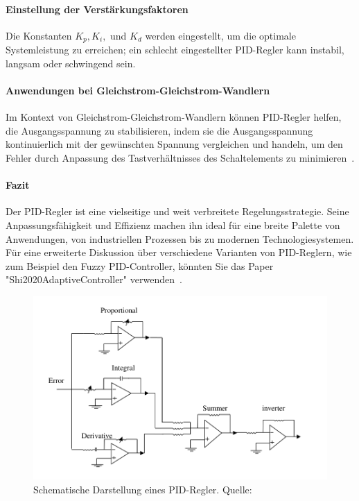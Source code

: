 \paragraph{Einstellung der Verstärkungsfaktoren}
Die Konstanten \( K_p, K_i, \) und \( K_d \) werden eingestellt, um die optimale Systemleistung zu erreichen; ein schlecht eingestellter PID-Regler kann instabil, langsam oder schwingend sein.

\paragraph{Anwendungen bei Gleichstrom-Gleichstrom-Wandlern}
Im Kontext von Gleichstrom-Gleichstrom-Wandlern können PID-Regler helfen, die Ausgangsspannung zu stabilisieren, indem sie die Ausgangsspannung kontinuierlich mit der gewünschten Spannung vergleichen und handeln, um den Fehler durch Anpassung des Tastverhältnisses des Schaltelements zu minimieren~\cite[p.~4]{Almawlawe2023}.

\paragraph{Fazit}
Der PID-Regler ist eine vielseitige und weit verbreitete Regelungsstrategie. Seine Anpassungsfähigkeit und Effizienz machen ihn ideal für eine breite Palette von Anwendungen, von industriellen Prozessen bis zu modernen Technologiesystemen. Für eine erweiterte Diskussion über verschiedene Varianten von PID-Reglern, wie zum Beispiel den Fuzzy PID-Controller, könnten Sie das Paper "Shi2020AdaptiveController" verwenden~\cite[p.~9]{Shi2020AdaptiveController}.


\begin{figure}[htbp]
    \centering
    \includegraphics[width=0.6\linewidth]{2Grundlagen/13PID.png}
    \caption{Schematische Darstellung eines PID-Regler. Quelle: \cite[p.~18]{SwainBaid2014}}
    \label{fig:PID_converter}
\end{figure}
